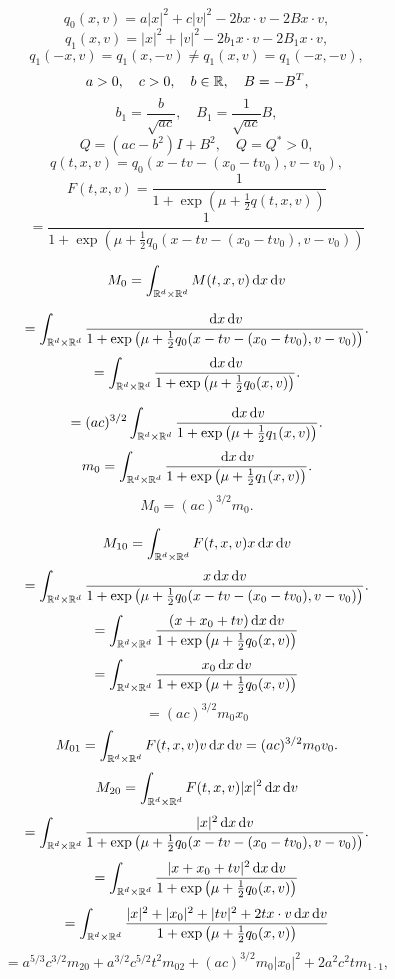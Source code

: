 \documentclass{article}
\begin{document}
\[
	q_0(x,v) = a|x|^2 + c|v|^2 - 2 b x\cdot v - 2Bx\cdot v,
\]
\[
	q_1(x,v) = |x|^2 + |v|^2 - 2b_1 x\cdot v - 2B_1x\cdot v,
\]
\[
	q_1(-x,v)=q_1(x,-v)\ne q_1(x,v)=q_1(-x,-v),
\]
\[
	a>0,\quad c>0,\quad b\in{\mathbb R},\quad B=-B^T,
\]
\[
	b_1 =\frac{b}{\sqrt{ac}}, \quad  B_1=\frac{1}{\sqrt{ac}}B,
\]
\[
	Q=(ac-b^2)I+B^2,\quad Q=Q^*>0,	
\]
\[
	q(t,x,v) = q_0(x-tv-(x_0-tv_0),v-v_0),
\]
\[
	F(t,x,v)=\frac{1}{1+\exp\left(\mu+\frac{1}{2}q(t,x,v)\right)}
\]
\[
	=\frac{1}{1+\exp\left(\mu+\frac{1}{2}q_0(x-tv-(x_0-tv_0),v-v_0)\right)}
\]

\[
	M_{0} = \int_{{{\mathbb R^d}\times{\mathbb R^d}}}^{}M(t,x,v){\,\mathrm{d} x}{\,\mathrm{d} v}
\]

\[
	= \int_{{{\mathbb R^d}\times{\mathbb R^d}}}^{}\frac{{\,\mathrm{d} x}{\,\mathrm{d} v}}{1+\exp\left(\mu+\frac{1}{2}q_0(x-tv-(x_0-tv_0),v-v_0)\right)}.
\]
\[
	=\int_{{{\mathbb R^d}\times{\mathbb R^d}}}^{}\frac{{\,\mathrm{d} x}{\,\mathrm{d} v}}{1+\exp\left(\mu+\frac{1}{2}q_0(x,v)\right)}.
\]

\[
	=(ac)^{3/2}\int_{{{\mathbb R^d}\times{\mathbb R^d}}}^{}\frac{{\,\mathrm{d} x}{\,\mathrm{d} v}}{1+\exp\left(\mu+\frac{1}{2}q_1(x,v)\right)}.
\]
\[
	m_0 = \int_{{{\mathbb R^d}\times{\mathbb R^d}}}^{}\frac{{\,\mathrm{d} x}{\,\mathrm{d} v}}{1+\exp\left(\mu+\frac{1}{2}q_1(x,v)\right)}.
\]
\[
	M_0 = (ac)^{3/2}m_0.
\]

\[
	M_{10} = \int_{{{\mathbb R^d}\times{\mathbb R^d}}}^{}F(t,x,v)x{\,\mathrm{d} x}{\,\mathrm{d} v}
\]
\[
	= \int_{{{\mathbb R^d}\times{\mathbb R^d}}}^{}\frac{x{\,\mathrm{d} x}{\,\mathrm{d} v}}{1+\exp\left(\mu+\frac{1}{2}q_0(x-tv-(x_0-tv_0),v-v_0)\right)}.
\]
\[
	=\int_{{{\mathbb R^d}\times{\mathbb R^d}}}^{}\frac{(x+x_0+tv){\,\mathrm{d} x}{\,\mathrm{d} v}}{1+\exp\left(\mu+\frac{1}{2}q_0(x,v)\right)}
\]
\[
	=\int_{{{\mathbb R^d}\times{\mathbb R^d}}}^{}\frac{x_0{\,\mathrm{d} x}{\,\mathrm{d} v}}{1+\exp\left(\mu+\frac{1}{2}q_0(x,v)\right)}
\]
\[
	=(ac)^{3/2}m_0x_0
\]
\[
	M_{01} = \int_{{{\mathbb R^d}\times{\mathbb R^d}}}^{}F(t,x,v)v{\,\mathrm{d} x}{\,\mathrm{d} v}= (ac)^{3/2}m_0v_0.
\]
\[
	M_{20} = \int_{\rdrd}^{}F(t,x,v)|x|^2\dx\dv
%
\]
\[
	= \int_{{{\mathbb R^d}\times{\mathbb R^d}}}^{}\frac{|x|^2{\,\mathrm{d} x}{\,\mathrm{d} v}}{1+\exp\left(\mu+\frac{1}{2}q_0(x-tv-(x_0-tv_0),v-v_0)\right)}.
\]
\[
	=\int_{{{\mathbb R^d}\times{\mathbb R^d}}}^{}\frac{|x+x_0+tv|^2{\,\mathrm{d} x}{\,\mathrm{d} v}}{1+\exp\left(\mu+\frac{1}{2}q_0(x,v)\right)}
\]
\[
	=\int_{{{\mathbb R^d}\times{\mathbb R^d}}}^{}\frac{|x|^2+|x_0|^2+|tv|^2+ 2tx\cdot v{\,\mathrm{d} x}{\,\mathrm{d} v}}{1+\exp\left(\mu+\frac{1}{2}q_0(x,v)\right)}
\]
\[
	=a^{5/3}c^{3/2}m_{20}+a^{3/2}c^{5/2}t^2m_{02}+(ac)^{3/2}m_{0}|x_0|^2 +2 a^2c^2tm_{1\cdot1},
\]
\end{document}
